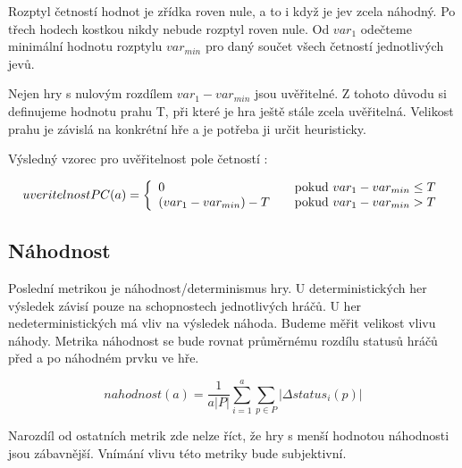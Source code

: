 Rozptyl četností hodnot je zřídka roven nule, a to i když je jev zcela náhodný. Po třech hodech kostkou nikdy nebude rozptyl roven nule. Od $var_1$ odečteme minimální hodnotu rozptylu $var_{min}$ pro daný součet všech četností jednotlivých jevů.

Nejen hry s nulovým rozdílem $var_1 - var_{min}$ jsou uvěřitelné. Z tohoto důvodu si definujeme hodnotu prahu T, při které je hra ještě stále zcela uvěřitelná. Velikost prahu je závislá na konkrétní hře a je potřeba ji určit heuristicky.

Výsledný vzorec pro uvěřitelnost pole četností :

	\[
	uveritelnostPC(a) = \left\{
  \begin{array}{l l}
    0 & \quad \text{pokud $var_1 - var_{min} \leq T$}\\
    (var_1 - var_{min}) - T & \quad \text{pokud $var_1 - var_{min} > T$}
  \end{array} \right.
\]


\subsection{Náhodnost}

Poslední metrikou je náhodnost/determinismus hry. U deterministických her výsledek závisí pouze na schopnostech jednotlivých hráčů. U her nedeterministických má vliv na výsledek náhoda. Budeme měřit velikost vlivu náhody. Metrika náhodnost se bude rovnat průměrnému rozdílu statusů hráčů před a po náhodném prvku ve hře.

	\[
	nahodnost(a) = \frac{1}{a |P|}\sum_{i=1}^a{\sum_{p \in P} |\Delta status_i(p)|}
\]

Narozdíl od ostatních metrik zde nelze říct, že hry s menší hodnotou náhodnosti jsou zábavnější. Vnímání vlivu této metriky bude subjektivní.
